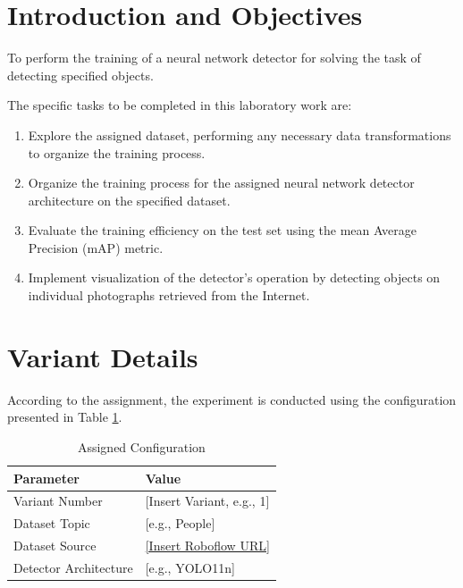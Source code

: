 \documentclass[12pt, a4paper]{article}
\begin{document}
\tableofcontents
\newpage


\section{Introduction and Objectives}

\begin{tcolorbox}[title=Laboratory Goal]
To perform the training of a neural network detector for solving the task of detecting specified objects.
\end{tcolorbox}

The specific tasks to be completed in this laboratory work are:
\begin{enumerate}
    \item Explore the assigned dataset, performing any necessary data transformations to organize the training process.
    \item Organize the training process for the assigned neural network detector architecture on the specified dataset.
    \item Evaluate the training efficiency on the test set using the mean Average Precision (mAP) metric.
    \item Implement visualization of the detector's operation by detecting objects on individual photographs retrieved from the Internet.
\end{enumerate}

\section{Variant Details}
According to the assignment, the experiment is conducted using the configuration presented in Table \ref{tab:variant}.

\begin{table}[htpb]
    \centering
    \caption{Assigned Configuration}
    \label{tab:variant}
    \begin{tabular}{ll}
        \toprule
        \textbf{Parameter} & \textbf{Value} \\
        \midrule
        Variant Number & [Insert Variant, e.g., 1] \\
        Dataset Topic & [e.g., People] \\
        Dataset Source & \url{[Insert Roboflow URL]} \\
        Detector Architecture & [e.g., YOLO11n] \\
        \bottomrule
    \end{tabular}
\end{table}
\end{document}
